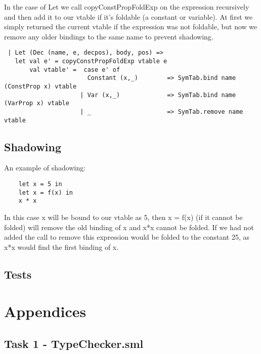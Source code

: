 \documentclass{article}
\begin{document}
\noindent In the case of Let we call copyConstPropFoldExp on the expression recursively and then add it to our vtable if it's foldable (a constant or variable). At first we simply returned the current vtable if the expression was not foldable, but now we remove any older bindings to the same name to prevent shadowing.

\begin{lstlisting}
 | Let (Dec (name, e, decpos), body, pos) => 
   let val e' = copyConstPropFoldExp vtable e
       val vtable' =  case e' of
                       Constant (x,_)        => SymTab.bind name (ConstProp x) vtable 
                     | Var (x,_)             => SymTab.bind name (VarProp x) vtable
                     | _                     => SymTab.remove name vtable
\end{lstlisting}

\subsection{Shadowing}
\noindent An example of shadowing:

\begin{lstlisting}
    let x = 5 in
    let x = f(x) in
    x * x
\end{lstlisting}

\noindent In this case x will be bound to our vtable as 5, then x = f(x) (if it cannot be folded) will remove the old binding of x and x*x cannot be folded. If we had not added the call to remove this expression would be folded to the constant 25, as x*x would find the first binding of x.

\subsection{Tests}

\section{Appendices}

\subsection{Task 1 - TypeChecker.sml}\label{app:1type}
\end{document}
